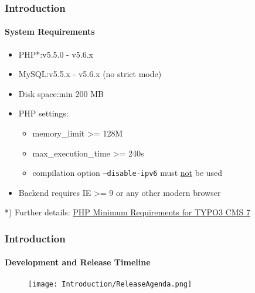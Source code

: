 \begin{frame}[fragile]
	\frametitle{Introduction}
	\framesubtitle{System Requirements}

	\begin{itemize}
		\item PHP*:\tabto{2.2cm}v5.5.0 - v5.6.x
		\item MySQL:\tabto{2.2cm}v5.5.x - v5.6.x (no strict mode)
		\item Disk space:\tabto{2.2cm}min 200 MB
		\item PHP settings:

			\begin{itemize}
				\item memory\_limit >= 128M
				\item max\_execution\_time >= 240s
				\item compilation option \texttt{--disable-ipv6} must \underline{not} be used
			\end{itemize}

		\item Backend requires IE >= 9 or any other modern browser

	\end{itemize}

	\vspace{1cm}

	*) Further details: \href{http://typo3.org/news/article/php-minimum-requirements-for-typo3-cms-7/}{PHP Minimum Requirements for TYPO3 CMS 7}

\end{frame}

\begin{frame}[fragile]
	\frametitle{Introduction}
	\framesubtitle{Development and Release Timeline}

	\begin{figure}
		\texttt{[image: Introduction/ReleaseAgenda.png]}
	\end{figure}

\end{frame}

